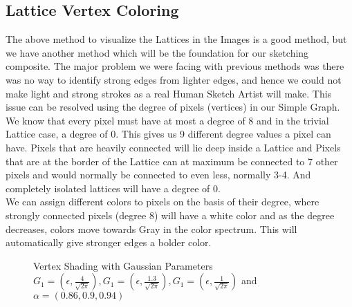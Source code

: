 \documentclass{article}
\begin{document}
\clearpage
\subsection{Lattice Vertex Coloring}
The above method to visualize the Lattices in the Images is a good method, but we have another method 
which will be the foundation for our sketching composite. The major problem we were facing with previous 
methods was there was no way to identify strong edges from lighter edges, and hence we could not make 
light and strong strokes as a real Human Sketch Artist will make. This issue can be resolved using the 
degree of pixels  (vertices) in our Simple Graph. \\

We know that every pixel must have at most a degree of 8 and in the trivial Lattice case, a degree of 0. 
This gives us 9 different degree values a pixel can have. Pixels that are heavily connected will lie deep 
inside a Lattice and Pixels that are at the border of the Lattice can at maximum be connected to 7 other 
pixels and would normally be connected to even less, normally 3-4. And completely isolated lattices will 
have a degree of 0. \\

We can assign different colors to pixels on the basis of their degree, where strongly connected pixels 
(degree 8) will have a white color and as the degree decreases, colors move towards Gray in the color 
spectrum. This will automatically give stronger edges a bolder color.

\begin{figure}[ht]
    \centering
    \qquad
    \qquad
    \qquad
    \caption{Vertex Shading with Gaussian Parameters $G_1=(\epsilon, \frac{4}{\sqrt{2 \pi}}), G_1=(\epsilon, \frac{1.3}{\sqrt{2 \pi}}), G_1=(\epsilon, \frac{1}{\sqrt{2 \pi}})$ and $\alpha=(0.86, 0.9, 0.94)$ \label{fig:lenna-vertex-shading-(4, 1.3, 1)-(0.86, 0.9, 0.94)}}
\end{figure}
\end{document}
